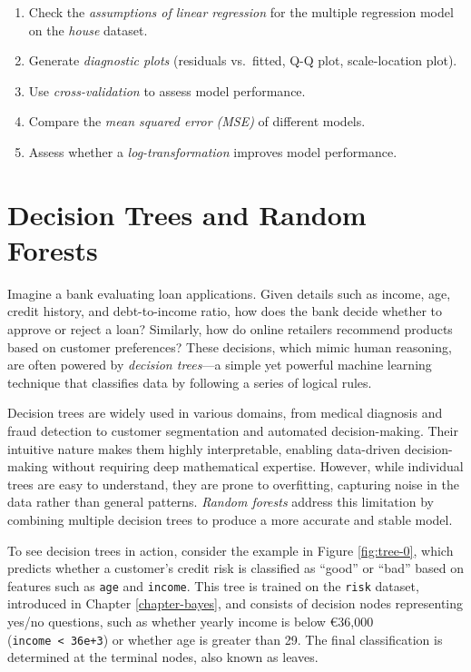 \documentclass[
  11pt,
]{book}
\providecommand{\tightlist}{%
  \setlength{\itemsep}{0pt}\setlength{\parskip}{0pt}}
\theoremstyle{definition}
\theoremstyle{definition}
\theoremstyle{definition}
\theoremstyle{definition}
\theoremstyle{remark}
\begin{document}
\begin{enumerate}
\def\labelenumi{\arabic{enumi}.}
\setcounter{enumi}{49}
\tightlist
\item
  Check the \emph{assumptions of linear regression} for the multiple regression model on the \emph{house} dataset.\\
\item
  Generate \emph{diagnostic plots} (residuals vs.~fitted, Q-Q plot, scale-location plot).\\
\item
  Use \emph{cross-validation} to assess model performance.\\
\item
  Compare the \emph{mean squared error (MSE)} of different models.\\
\item
  Assess whether a \emph{log-transformation} improves model performance.
\end{enumerate}

\chapter{Decision Trees and Random Forests}\label{chapter-tree}

Imagine a bank evaluating loan applications. Given details such as income, age, credit history, and debt-to-income ratio, how does the bank decide whether to approve or reject a loan? Similarly, how do online retailers recommend products based on customer preferences? These decisions, which mimic human reasoning, are often powered by \emph{decision trees}---a simple yet powerful machine learning technique that classifies data by following a series of logical rules.

Decision trees are widely used in various domains, from medical diagnosis and fraud detection to customer segmentation and automated decision-making. Their intuitive nature makes them highly interpretable, enabling data-driven decision-making without requiring deep mathematical expertise. However, while individual trees are easy to understand, they are prone to overfitting, capturing noise in the data rather than general patterns. \emph{Random forests} address this limitation by combining multiple decision trees to produce a more accurate and stable model.

To see decision trees in action, consider the example in Figure \ref{fig:tree-0}, which predicts whether a customer's credit risk is classified as ``good'' or ``bad'' based on features such as \texttt{age} and \texttt{income}. This tree is trained on the \texttt{risk} dataset, introduced in Chapter \ref{chapter-bayes}, and consists of decision nodes representing yes/no questions, such as whether yearly income is below €36,000 (\texttt{income\ \textless{}\ 36e+3}) or whether age is greater than 29. The final classification is determined at the terminal nodes, also known as leaves.
\end{document}

